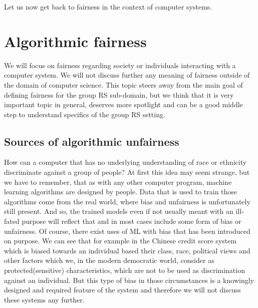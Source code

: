 Let us now get back to fairness in the context of computer systems.







\section{Algorithmic fairness}\label{subsec:02_general.algorithmic_fairness_and_possible_meanings}
We will focus on fairness regarding society or individuals interacting with a computer system. We will not discuss further any meaning of fairness outside of the domain of computer science. This topic steers away from the main goal of defining fairness for the group RS sub-domain, but we think that it is very important topic in general, deserves more spotlight and can be a good middle step to understand specifics of the group RS setting.

\subsection{Sources of algorithmic unfairness}

How can a computer that has no underlying understanding of race or ethnicity discriminate against a group of people? At first this idea may seem strange, but we have to remember, that as with any other computer program, machine learning algorithms are designed by people. Data that is used to train those algorithms come from the real world, where bias and unfairness is unfortunately still present. And so, the trained models even if not usually meant with an ill-fated purpose will reflect that and in most cases include some form of bias or unfairness.
Of course, there exist uses of ML with bias that has been introduced on purpose. We can see that for example in the Chinese credit score system which is biased towards an individual based their class, race, political views and other factors which we, in the modern democratic world, consider as protected(sensitive) characteristics, which are not to be used as discrimination against an individual. But this type of bias in those circumstances is a knowingly designed and required feature of the system and therefore we will not discuss these systems any further.

